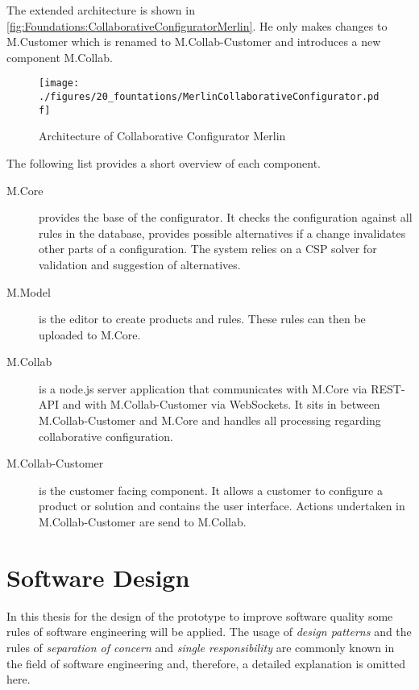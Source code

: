 The extended architecture is shown in \autoref{fig:Foundations:CollaborativeConfiguratorMerlin}.
He only makes changes to M.Customer which is renamed to M.Collab-Customer and introduces a new component M.Collab.

\begin{figure}
    \centering
    \texttt{[image: ./figures/20\_fountations/MerlinCollaborativeConfigurator.pdf]}
    \caption[Architecture: Collaborative Configurator]{Architecture of Collaborative Configurator Merlin \cite[Fig. 4.3]{raabKollaborativeProduktkonfigurationEchtzeit2019}}
    \label{fig:Foundations:CollaborativeConfiguratorMerlin}
\end{figure}

The following list provides a short overview of each component.

\begin{description}
    \item[M.Core] provides the base of the configurator. It checks the configuration against all rules in the database, provides possible alternatives if a change invalidates other parts of a configuration. The system relies on a CSP solver for validation and suggestion of alternatives.
    \item[M.Model] is the editor to create products and rules. These rules can then be uploaded to M.Core.
    \item[M.Collab] is a node.js server application that communicates with M.Core via REST-API and with M.Collab-Customer via WebSockets. It sits in between M.Collab-Customer and M.Core and handles all processing regarding collaborative configuration.
    \item[M.Collab-Customer] is the customer facing component. It allows a customer to configure a product or solution and contains the user interface. Actions undertaken in M.Collab-Customer are send to M.Collab.
\end{description}

\section{Software Design}
\label{sec:Foundations:BaseSystem}

In this thesis for the design of the prototype to improve software quality some rules of software engineering will be applied. The usage of \emph{design patterns} \cite{gamma2015design} and the rules of \emph{separation of concern} \cite{de2002importance} and \emph{single responsibility} \cite{martinCleanArchitectureCraftsman2017} are commonly known in the field of software engineering and, therefore, a detailed explanation is omitted here.


